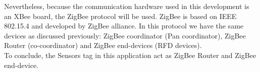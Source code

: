  Nevertheless, because the communication hardware used in this development is an XBee board, the ZigBee protocol will be used. ZigBee is based on IEEE 802.15.4 and developed by ZigBee alliance. In this protocol we have the same devices as discussed previously: ZigBee coordinator (Pan coordinator), ZigBee Router (co-coordinator) and ZigBee end-devices (RFD devices).\\
 To conclude, the Sensors tag in this application act as ZigBee Router and ZigBee end-device.
\\
